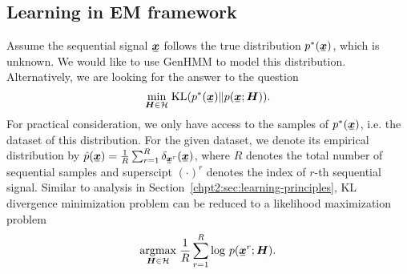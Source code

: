 \subsection{Learning in EM framework}

Assume the sequential signal $\ubm{x}$ follows the true distribution $p^{\ast}(\ubm{x})$, which is unknown. We would like to use GenHMM to model this distribution. Alternatively, we are looking for the answer to the question
\begin{equation}
  \umin{\bm{H}\in \Hh} \mathrm{KL}({p^{\ast}}(\ubm{x})\| p(\ubm{x};\bm{H})).
\end{equation}
For practical consideration, we only have access to the samples of $p^{\ast}(\ubm{x})$, i.e. the dataset of this distribution. For the given dataset, we denote its empirical distribution by $\hat{p}(\ubm{x}) = \frac{1}{R}\sum_{r=1}^{R} \delta_{\ubmr{x}{r}}(\ubm{x})$, where $R$ denotes the total number of sequential samples and superscipt $(\cdot)^{r}$ denotes the index of $r$-th sequential signal. Similar to analysis in Section~\ref{chpt2:sec:learning-principles}, KL divergence minimization problem can be reduced to a likelihood maximization problem
\begin{equation}\label{eq:ml-of-hmm}
  \uargmax{\bm{H} \in \Hh} \frac{1}{R}\sum_{r=1}^{R}\log\,p(\ubmr{x}{r}; \bm{H}).
\end{equation}

